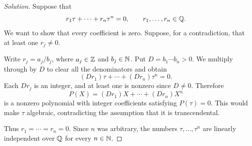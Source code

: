 
\begin{proof}[Solution]
Suppose that
\[
  r_1\tau+\cdots+r_n\tau^n=0,
  \qquad r_1,\ldots,r_n\in\mathbb{Q}.
\]
We want to show that every coefficient is zero. Suppose, for a
contradiction, that at least one $r_j\ne0$.

Write $r_j=a_j/b_j$, where $a_j\in\mathbb{Z}$ and $b_j\in\mathbb{N}$.
Put $D=b_1\cdots b_n>0$. We multiply through by $D$ to clear
all the denominators and obtain
\[
  (Dr_1)\tau+\cdots+(Dr_n)\tau^n=0.
\]
Each $Dr_j$ is an integer, and at least one is nonzero since
$D\ne0$. Therefore
\[
  P(X)=(Dr_1)X+\cdots+(Dr_n)X^n
\]
is a nonzero polynomial with integer coefficients satisfying
$P(\tau)=0$. This would make $\tau$ algebraic, contradicting
the assumption that it is transcendental.

Thus $r_1=\cdots=r_n=0$. Since $n$ was arbitrary, the numbers
$\tau,\ldots,\tau^n$ are linearly independent over $\mathbb{Q}$ for every
$n\in\mathbb{N}$.
\end{proof}
